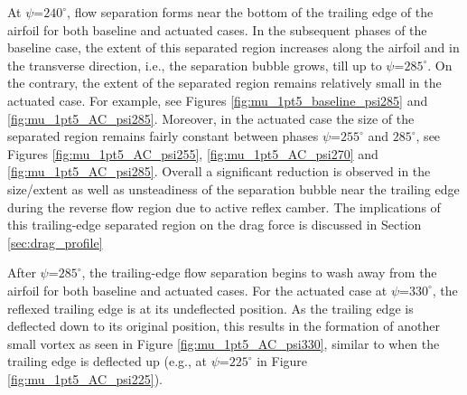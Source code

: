 At $\psi$=$240^\circ$, flow separation forms near the bottom of the trailing edge of the airfoil for both baseline and actuated cases.
In the subsequent phases of the baseline case, the extent of this separated region increases along the airfoil and in the transverse direction, i.e., the separation bubble grows, till up to $\psi$=$285^\circ$. 
On the contrary, the extent of the separated region remains relatively small in the actuated case. For example, see Figures \ref{fig:mu_1pt5_baseline_psi285} and \ref{fig:mu_1pt5_AC_psi285}.
Moreover, in the actuated case the size of the separated region remains fairly constant between phases $\psi$=$255^\circ$ and $285^\circ$, see Figures \ref{fig:mu_1pt5_AC_psi255}, \ref{fig:mu_1pt5_AC_psi270} and \ref{fig:mu_1pt5_AC_psi285}.
Overall a significant reduction is observed in the size/extent as well as unsteadiness of the separation bubble near the trailing edge during the reverse flow region due to active reflex camber.
The implications of this trailing-edge separated region on the drag force is discussed in Section \ref{sec:drag_profile}

After $\psi$=$285^\circ$, the trailing-edge flow separation begins to wash away from the airfoil for both baseline and actuated cases.
For the actuated case at $\psi$=$330^\circ$, the reflexed trailing edge is at its undeflected position.
As the trailing edge is deflected down to its original position, this results in the formation of another small vortex as seen in Figure \ref{fig:mu_1pt5_AC_psi330}, similar to when the trailing edge is deflected up (e.g., at $\psi$=$225^\circ$ in Figure \ref{fig:mu_1pt5_AC_psi225}).

